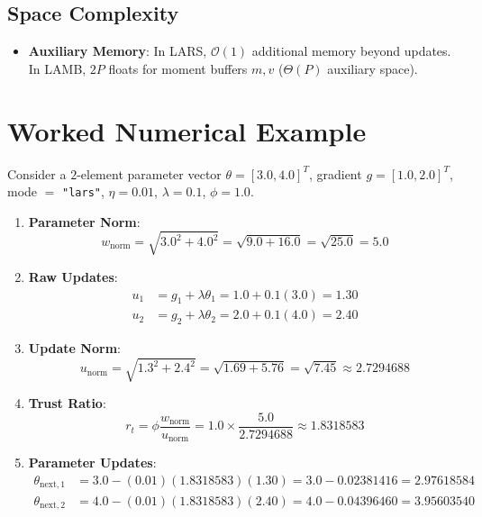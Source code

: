 \documentclass[11pt,a4paper]{article}
\theoremstyle{definition}
\begin{document}
\subsection{Space Complexity}
\begin{itemize}
    \item \textbf{Auxiliary Memory}: In LARS, $\mathcal{O}(1)$ additional memory beyond updates. In LAMB, $2P$ floats for moment buffers $m, v$ ($\Theta(P)$ auxiliary space).
\end{itemize}

\section{Worked Numerical Example}

Consider a $2$-element parameter vector $\theta = [3.0, 4.0]^T$, gradient $g = [1.0, 2.0]^T$, mode $=$ \texttt{"lars"}, $\eta = 0.01$, $\lambda = 0.1$, $\phi = 1.0$.

\begin{enumerate}
    \item \textbf{Parameter Norm}:
    \begin{equation}
    w_{\text{norm}} = \sqrt{3.0^2 + 4.0^2} = \sqrt{9.0 + 16.0} = \sqrt{25.0} = 5.0
    \end{equation}
    \item \textbf{Raw Updates}:
    \begin{align}
    u_1 &= g_1 + \lambda \theta_1 = 1.0 + 0.1(3.0) = 1.30 \\
    u_2 &= g_2 + \lambda \theta_2 = 2.0 + 0.1(4.0) = 2.40
    \end{align}
    \item \textbf{Update Norm}:
    \begin{equation}
    u_{\text{norm}} = \sqrt{1.3^2 + 2.4^2} = \sqrt{1.69 + 5.76} = \sqrt{7.45} \approx 2.7294688
    \end{equation}
    \item \textbf{Trust Ratio}:
    \begin{equation}
    r_t = \phi \frac{w_{\text{norm}}}{u_{\text{norm}}} = 1.0 \times \frac{5.0}{2.7294688} \approx 1.8318583
    \end{equation}
    \item \textbf{Parameter Updates}:
    \begin{align}
    \theta_{\text{next}, 1} &= 3.0 - (0.01)(1.8318583)(1.30) = 3.0 - 0.02381416 = 2.97618584 \\
    \theta_{\text{next}, 2} &= 4.0 - (0.01)(1.8318583)(2.40) = 4.0 - 0.04396460 = 3.95603540
    \end{align}
\end{enumerate}
\end{document}
